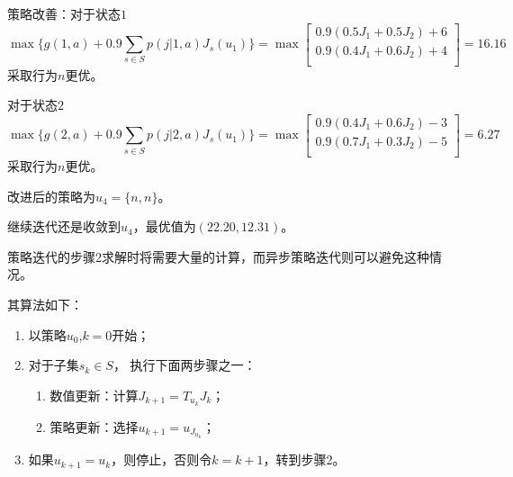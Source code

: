 \begin{example}
    策略改善：对于状态$1$
    \begin{equation}
        \max \{g(1,a) + 0.9 \sum_{s\in S}p(j|1,a) J_s(u_1)\} = \max \begin{bmatrix}
            0.9(0.5J_1+0.5J_2) + 6 \\
            0.9(0.4J_1+0.6J_2) +4  \\
        \end{bmatrix} = 16.16
    \end{equation}
    采取行为$n$更优。

    对于状态$2$
    \begin{equation}
        \max \{g(2,a) + 0.9 \sum_{s\in S}p(j|2,a) J_s(u_1)\} = \max \begin{bmatrix}
            0.9(0.4J_1+0.6J_2) - 3 \\
            0.9(0.7J_1+0.3J_2) - 5 \\
        \end{bmatrix} = 6.27
    \end{equation}
    采取行为$n$更优。

    改进后的策略为$u_4 = \{n,n\}$。

    继续迭代还是收敛到$u_4$，最优值为$(22.20,12.31)$。
\end{example}

策略迭代的步骤2求解时将需要大量的计算，而异步策略迭代则可以避免这种情况。

其算法如下：

\begin{enumerate}[itemsep=0pt,parsep=0pt]
    \item 以策略$u_0$,$k=0$开始；
    \item 对于子集$s_k\in S$， 执行下面两步骤之一：
          \begin{enumerate}[itemsep=0pt,parsep=0pt]
              \item 数值更新：计算$J_{k+1} = T_{u_k}J_k$；
              \item 策略更新：选择$u_{k+1} = u_{J_{u_k}}$；
          \end{enumerate}
    \item 如果$u_{k+1} = u_k$，则停止，否则令$k=k+1$，转到步骤2。
\end{enumerate}

